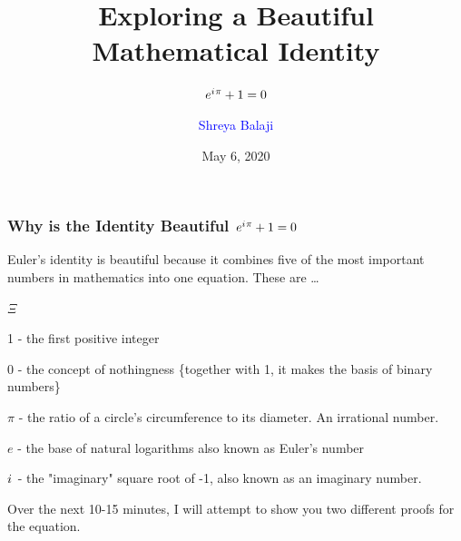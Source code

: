 \documentclass[10pt]{beamer}
\newcommand{\iu}{{i\mkern1mu}}
\begin{document}
\author{\Large\textcolor{blue}{Shreya Balaji}}
\title{Exploring a Beautiful Mathematical Identity}
\subtitle{\huge\(e^{\iu \pi} +1 = 0\)}
\date{May 6, 2020}


\begin{frame}[plain]
	\maketitle
\end{frame}

\begin{frame}
	\frametitle{Why is the Identity Beautiful \hspace{25pt} \textcolor{pink}{\Huge\(e^{\iu \pi} + 1 =0\)}}
	
	Euler's identity is beautiful because it combines five of the most important numbers in mathematics into one equation. These are \dots
	\begin{list}{$\Xi$}{}
	\item 1 - the first positive integer
	\item 0 - the concept of nothingness \{together with 1, it makes the basis of binary numbers\}
	\item {\bf${\pi}$} - the ratio of a circle's circumference to its diameter. An irrational number.
	\item $e$ - the base of natural logarithms also known as Euler's number
	\item $\iu$ - the "imaginary" square root of -1, also known as an imaginary number.
	\end{list}
\vspace{20pt}
Over the next 10-15 minutes, I will attempt to show you two different proofs for the equation.
	
\end{frame}
\end{document}
